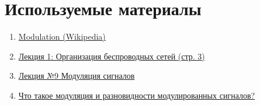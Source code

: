 \documentclass[a4paper,14pt]{extarticle}
\begin{document}
\section{Используемые материалы}

\begin{enumerate}
\item \href{https://en.wikipedia.org/wiki/Modulation}{Modulation (Wikipedia)}
\item \href{https://www.intuit.ru/studies/courses/1004/202/lecture/5236?page=3}{Лекция 1: Организация беспроводных сетей (стр. 3)}
\item \href{https://refdb.ru/look/1101001.html}{Лекция №9 Модуляция сигналов}
\item \href{http://conture.by/post/422}{Что такое модуляция и разновидности модулированных сигналов?}
\end{enumerate}
\end{document}
